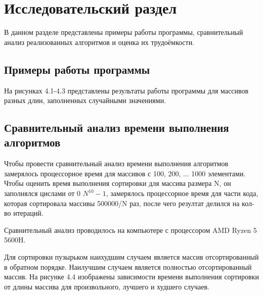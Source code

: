 \chapter{Исследовательский раздел}
В данном разделе представлены примеры работы программы, сравнительный анализ реализованных алгоритмов и оценка их трудоёмкости.


\section{Примеры работы программы}
На рисунках 4.1-4.3 представлены результаты работы программы для массивов разных длин, заполненных случайными значениями.




\newpage
\section{Сравнительный анализ времени выполнения алгоритмов}
Чтобы провести сравнительный анализ времени выполнения алгоритмов замерялось процессорное время для массивов с 100, 200, ... 1000 элементами. Чтобы оценить время выполнения сортировки для массива размера N, он заполнялся цислами от 0 $N^{10}-1$, замерялось процессорное время для части кода, которая сортировала массивы 500000/N раз, после чего резултат делился на кол-во итераций.

Сравнительный анализ проводилось на компьютере с процессором AMD Ryzen 5 5600H.

Для сортировки пузырьком наихудшим случаем является массив отсортированный в обратном порядке. Наилучшим случаем является полностью отсортированный массив. На рисунке 4.4 изображены зависимости времени выполнения сортировки от длины массива для произвольного, лучшего и худшего случаев. \cite{teoriya}

